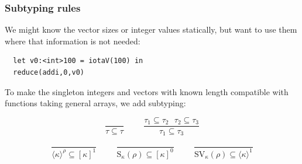 \documentclass{beamer}
\newcommand{\A}[2]{[#1]^{#2}}
\newcommand{\V}[2]{\langle#1\rangle^{#2}}
\renewcommand{\S}[2]{\textrm{S}_{#1}(#2)}
\newcommand{\SV}[2]{\textrm{SV}_{#1}(#2)}
\begin{document}
\begin{frame}[fragile]
\frametitle{Subtyping rules}

We might know the vector sizes or integer values statically, but want
to use them where that information is not needed:

\begin{verbatim}
  let v0:<int>100 = iotaV(100) in
  reduce(addi,0,v0)
\end{verbatim}

To make the singleton integers and vectors with known length
compatible with functions taking general arrays, we add subtyping:

\begin{equation*}
\frac{}{\tau \subseteq \tau}\hspace{1cm}
\frac{\tau_1 \subseteq \tau_2 ~~~ \tau_2 \subseteq \tau_3}{\tau_1 \subseteq \tau_3}
\end{equation*}

\begin{equation*}
\frac{}{\V{\kappa}{\rho} \subseteq \A{\kappa}{1}}\hspace{1cm}
\frac{}{\S{\kappa}{\rho} \subseteq \A{\kappa}{0}}\hspace{1cm}
\frac{}{\SV{\kappa}{\rho} \subseteq \V{\kappa}{1}}
\end{equation*}


\end{frame}






\end{document}
